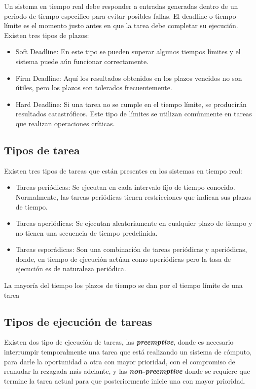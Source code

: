     Un sistema en tiempo real debe  responder a entradas generadas dentro de un periodo de tiempo especifico para evitar posibles fallas. El deadline o tiempo límite es el momento justo antes en que la tarea debe completar su ejecución. Existen tres tipos de plazos: 
\begin{itemize}
\item Soft Deadline: En este tipo se pueden superar algunos tiempos límites y el sistema puede aún funcionar correctamente.
\item Firm Deadline: Aquí los resultados obtenidos en los plazos vencidos no son útiles, pero los plazos son tolerados frecuentemente.
\item Hard Deadline: Si una tarea no se cumple en el tiempo límite, se producirán resultados catastróficos. Este tipo de límites se utilizan comúnmente en tareas que realizan operaciones críticas.
\end{itemize}   

\subsection{Tipos de tarea}

Existen tres tipos de tareas que están presentes en los sistemas en tiempo real:

\begin{itemize}
\item Tareas periódicas: Se ejecutan en cada intervalo fijo de tiempo conocido. Normalmente, las tareas periódicas tienen restricciones que indican sus plazos de tiempo.
\item Tareas aperiódicas: Se ejecutan aleatoriamente en cualquier plazo de tiempo y no tienen una secuencia de tiempo predefinida.
\item Tareas esporádicas: Son una combinación de tareas periódicas y aperiódicas, donde, en tiempo de ejecución actúan como aperiódicas pero la tasa de ejecución es de naturaleza periódica.
\end{itemize}   

La mayoría del tiempo los plazos de tiempo se dan por el tiempo límite de una tarea

    \subsection{Tipos de ejecución de tareas}

    Existen dos tipo de ejecución de tareas, las \textit{\textbf{preemptive}}, donde es necesario interrumpir temporalmente una tarea que está realizando un sistema de cómputo, para darle la oportunidad a otra con mayor prioridad, con el compromiso de reanudar la rezagada más adelante, y las \textit{\textbf{non-preemptive}} donde se requiere que termine la tarea actual para que posteriormente inicie una con mayor prioridad.

